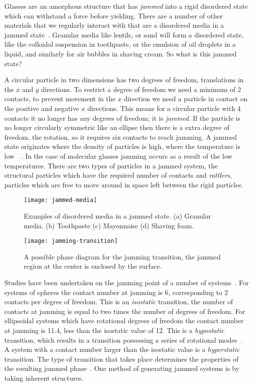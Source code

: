 Glasses are an amorphous structure that has \emph{jammed} into a rigid disordered state which can withstand a force before yielding. There are a number of other materials that we regularly interact with that are a disordered media in a jammed state~. Granular media like lentils, or sand will form a disordered state, like the colloidal suspension in toothpaste, or the emulsion of oil droplets in a liquid, and similarly for air bubbles in shaving cream. So what is this jammed state?

A circular particle in two dimensions has two degrees of freedom, translations in the $x$ and $y$ directions. To restrict a degree of freedom we need a minimum of 2 contacts, to prevent movement in the $x$ direction we need a particle in contact on the positive and negative $x$ directions. This means for a circular particle with 4 contacts it no longer has any degrees of freedom; it is \emph{jammed}. If the particle is no longer circularly symmetric like an ellipse then there is a extra degree of freedom, the rotation, so it requires six contacts to reach jamming. A jammed state originates where the density of particles is high, where the temperature is low~~\cite{liu:98,ohern:03,vanhecke:10}. In the case of molecular glasses jamming occurs as a result of the low temperatures. There are two types of particles in a jammed system, the structural particles which have the required number of contacts and \emph{rattlers}, particles which are free to move around in space left between the rigid particles. 


\begin{figure}
    \centering
    \texttt{[image: jammed-media]}
    \caption{Examples of disordered media in a jammed state. (a) Granular media. (b) Toothpaste (c) Mayonnaise (d) Shaving foam.}
    \label{fig:jammed media}
\end{figure}

\begin{figure}
    \centering
    \texttt{[image: jamming-transition]}
    \caption{A possible phase diagram for the jamming transition, the jammed region at the center is enclosed by the surface.}
    \label{fig:jammed media}
\end{figure}

Studies have been undertaken on the jamming point of a number of systems~\cite{vanhecke:10}. For systems of spheres the contact number at jamming is 6, corresponding to 2 contacts per degree of freedom. This is an \emph{isostatic} transition, the number of contacts at jamming is equal to two times the number of degrees of freedom. For ellipsoidal systems which have rotational degrees of freedom the contact number at jamming is 11.4, less than the isostatic value of 12. This is a \emph{hypostatic} transition, which results in a transition possessing a series of rotational modes~\cite{mailman:09}. A system with a contact number larger than the isostatic value is a \emph{hyperstatic} transition. The type of transition that takes place determines the properties of the resulting jammed phase~\cite{schreck:11}. One method of generating jammed systems is by taking inherent structures.

